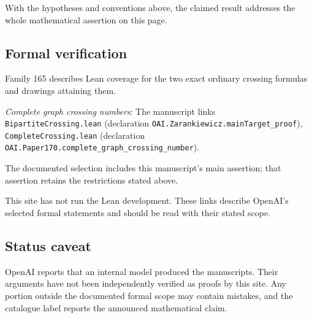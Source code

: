 \documentclass[11pt]{article}
\begin{document}
With the hypotheses and conventions above, the claimed result addresses the whole mathematical assertion on this page.

\subsection{Formal verification}
Family 165 describes Lean coverage for the two exact ordinary crossing formulas and drawings attaining them.

\textit{Complete graph crossing numbers}: The manuscript links \texttt{BipartiteCrossing.lean} (declaration \texttt{OAI.Zarankiewicz.mainTarget\_proof}), \texttt{CompleteCrossing.lean} (declaration \texttt{OAI.Paper170.complete\_graph\_crossing\_number}).

The documented selection includes this manuscript’s main assertion; that assertion retains the restrictions stated above.

This site has not run the Lean development. These links describe OpenAI’s selected formal statements and should be read with their stated scope.

\subsection{Status caveat}
OpenAI reports that an internal model produced the manuscripts. Their arguments have not been independently verified as proofs by this site. Any portion outside the documented formal scope may contain mistakes, and the catalogue label reports the announced mathematical claim.
\end{document}
